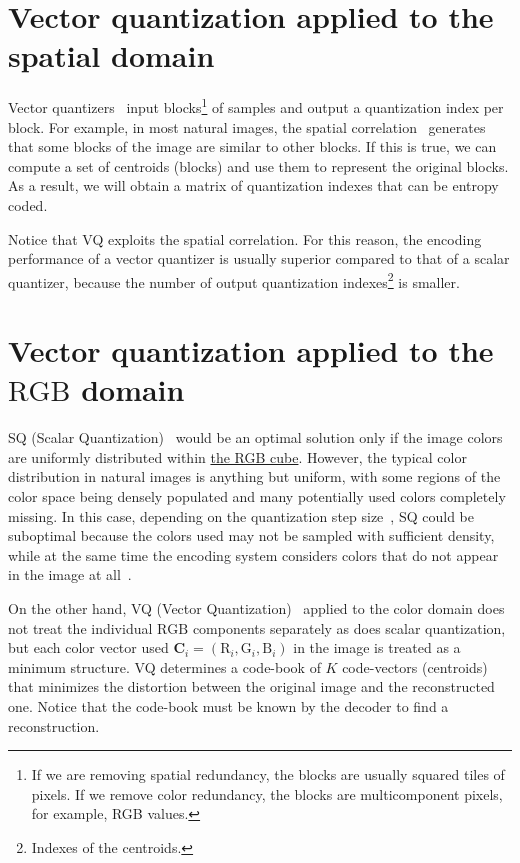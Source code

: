 \section{Vector quantization applied to the spatial domain}

Vector quantizers~\cite{vruiz__vector_quantization} input
blocks\footnote{If we are removing spatial redundancy, the blocks are
  usually squared tiles of pixels. If we remove color redundancy, the
  blocks are multicomponent pixels, for example, RGB values.} of
samples and output a quantization index per block. For example, in
most natural images, the spatial
correlation~\cite{vruiz__visual_redundancy} generates that some blocks
of the image are similar to other blocks. If this is true, we can
compute a set of centroids (blocks) and use them to represent the
original blocks. As a result, we will obtain a matrix of quantization
indexes that can be entropy coded.

Notice that VQ exploits the spatial correlation. For this reason, the
encoding performance of a vector quantizer is usually superior
compared to that of a scalar quantizer, because the number of output
quantization indexes\footnote{Indexes of the centroids.} is smaller.

\section{Vector quantization applied to the $\text{RGB}$ domain}

SQ (Scalar
Quantization)~\cite{vruiz__scalar_quantization,sayood2017introduction}
would be an optimal solution only if the image colors are uniformly
distributed within
\href{https://en.wikipedia.org/wiki/RGB_color_model}{the RGB
  cube}. However, the typical color distribution in natural images is
anything but uniform, with some regions of the color space being
densely populated and many potentially used colors completely
missing. In this case, depending on the quantization step
size~\cite{vruiz__signal_quantization}, SQ could be suboptimal because
the colors used may not be sampled with sufficient density, while at the
same time the encoding system considers colors that do not appear
in the image at all~\cite{burger2016digital}.

On the other hand, VQ (Vector
Quantization)~\cite{vruiz__vector_quantization,sayood2017introduction}
applied to the color domain does not treat the individual $\text{RGB}$
components separately as does scalar quantization, but each color
vector used ${\mathbf C}_i = (\text{R}_i, \text{G}_i, \text{B}_i )$ in
the image is treated as a minimum structure. VQ determines a code-book
of $K$ code-vectors (centroids) that minimizes the distortion between
the original image and the reconstructed one. Notice that the
code-book must be known by the decoder to find a reconstruction.

